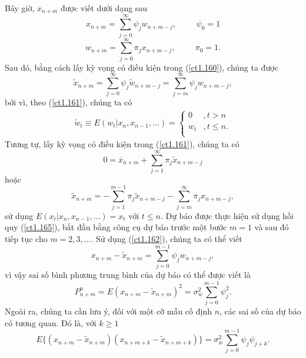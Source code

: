 \documentclass[12pt, a4paper,oneside]{book}
\theoremstyle{definition}
\begin{document}
Bây giờ, $x_{n+m}$ được viết dưới dạng sau
\begin{equation}
x_{n+m}= \sum_{j=0}^{\infty} \psi_{j}w_{n+m-j}, \hspace{1cm} \psi_{0}=1 \label{ct1.160}
\end{equation}
\begin{equation}
w_{n+m}= \sum_{j=0}^{\infty} \pi_{j}x_{n+m-j}, \hspace{1cm} \pi_{0}=1. \label{ct1.161}
\end{equation}
Sau đó, bằng cách lấy kỳ vọng có điều kiện trong (\ref{ct1.160}), chúng ta được
\begin{equation}
\tilde{x}_{n+m} =\sum_{j=0}^{\infty}\psi_{j}\tilde{w}_{n+m-j} = \sum_{j=m}^{\infty}\psi_jw_{n+m-j},\label{ct1.162}
\end{equation}
bởi vì, theo (\ref{ct1.161}), chúng ta có
\begin{align*}
\tilde{w}_{t}\equiv E(w_{t}|x_{n}, x_{n-1}, \dots) = 
\begin{cases} 
0&, t>n\\
w_t&, t \leqslant n.\\
\end{cases}
\end{align*}
Tương tự, lấy kỳ vọng có điều kiện trong (\ref{ct1.161}), chúng ta có
$$0 = \overline{x}_{n+m} + \sum_{j=1}^{\infty} \pi_{j}\tilde{x}_{n+m-j}$$
hoặc
\begin{equation}
\tilde{x}_{n+m} = -\sum_{j=1}^{m-1}\pi_{j}\tilde{x}_{n+m-j}- \sum_{j=m}^{\infty}\pi_{j}x_{n+m-j}, \label{ct1.165}
\end{equation}
sử dụng $E(x_{t}|x_{n}, x_{n-1}, \dots)= x_{t}$ với $t \leq n$. Dự báo được thực hiện sử dụng hồi quy (\ref{ct1.165}), bắt đầu bằng công cụ dự báo trước một bước $m = 1$ và sau đó tiếp tục cho $m = 2, 3, \dots$. Sử dụng (\ref{ct1.162}), chúng ta có thể viết
$$x_{n+m} - \tilde{x}_{n+m} = \sum_{j=0}^{m-1}\psi_{j}w_{n+m-j},$$
vì vậy sai số bình phương trung bình của dự báo có thể được viết là
\begin{equation}
P_{n+m}^{n}= E(x_{n+m} - \tilde{x}_{n+m})^{2}= \sigma^{2}_{w} \sum_{j=0}^{m-1}\psi_{j}^{2}. \label{ct1.167}
\end{equation}
Ngoài ra, chúng ta cần lưu ý, đối với một cỡ mẫu cố định $n$, các sai số của dự báo có tương quan. Đó là, với $k\geq 1$
\begin{equation}
E\{(x_{n+m}- \tilde{x}_{n+m})(x_{n+m+k} - \tilde{x}_{n+m+k})\}= \sigma_{w}^{2}\sum_{j=0}^{m-1}\psi_{j}\psi_{j+k}. \label{ct1.168}
\end{equation}
\end{document}
